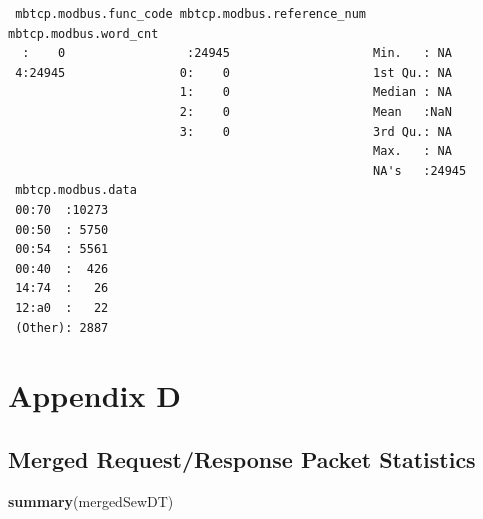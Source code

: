 \documentclass[12pt,]{article}
\newenvironment{Shaded}{\begin{snugshade}}{\end{snugshade}}
\newcommand{\KeywordTok}[1]{\textcolor[rgb]{0.13,0.29,0.53}{\textbf{{#1}}}}
\newcommand{\NormalTok}[1]{{#1}}
\begin{document}
\begin{verbatim}
 mbtcp.modbus.func_code mbtcp.modbus.reference_num mbtcp.modbus.word_cnt
  :    0                 :24945                    Min.   : NA          
 4:24945                0:    0                    1st Qu.: NA          
                        1:    0                    Median : NA          
                        2:    0                    Mean   :NaN          
                        3:    0                    3rd Qu.: NA          
                                                   Max.   : NA          
                                                   NA's   :24945        
 mbtcp.modbus.data
 00:70  :10273    
 00:50  : 5750    
 00:54  : 5561    
 00:40  :  426    
 14:74  :   26    
 12:a0  :   22    
 (Other): 2887    
\end{verbatim}

\newpage

\section*{Appendix D}\label{appendix-d}

\subsection*{Merged Request/Response Packet
Statistics}\label{merged-requestresponse-packet-statistics}

\begin{Shaded}
\begin{Highlighting}[]
\KeywordTok{summary}\NormalTok{(mergedSewDT)}
\end{Highlighting}
\end{Shaded}
\end{document}
